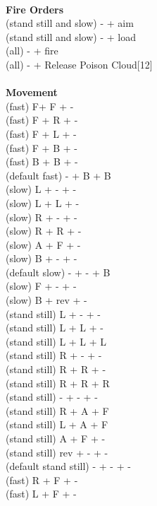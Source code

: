 \ \\ {\bf Fire Orders } \\
(stand still and slow) - + aim \\
(stand still and slow) - + load \\
(all) - + fire \\
(all) - + Release Poison Cloud[12] \\
\ \\ {\bf Movement } \\
(fast) F+ F + - \\
(fast) F + R + - \\
(fast) F + L + - \\
(fast) F + B + - \\
(fast) B + B + - \\
(default fast) - + B + B \\
(slow) L + - + - \\
(slow) L + L + - \\
(slow) R + - + - \\
(slow) R + R + - \\
(slow) A + F + - \\
(slow) B + - + - \\
(default slow) - + - + B \\
(slow) F + - + - \\
(slow) B + rev + - \\
(stand still) L + - + - \\
(stand still) L + L + - \\
(stand still) L + L + L \\
(stand still) R + - + - \\
(stand still) R + R + - \\
(stand still) R + R + R \\
(stand still) - + - + - \\
(stand still) R + A + F \\
(stand still) L + A + F \\
(stand still) A + F + - \\
(stand still) rev + - + - \\
(default stand still) - + - + - \\
(fast) R + F + - \\
(fast) L + F + - \\




